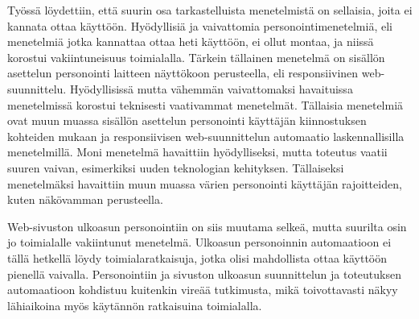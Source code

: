 \documentclass[finnish, 12pt, a4paper, elec, utf8, a-1b, online]{aaltothesis}
\begin{document}
Työssä löydettiin, että suurin osa tarkastelluista menetelmistä on sellaisia,
joita ei kannata ottaa käyttöön. Hyödyllisiä ja vaivattomia
personointimenetelmiä, eli menetelmiä jotka kannattaa ottaa heti käyttöön, ei
ollut montaa, ja niissä korostui vakiintuneisuus toimialalla. Tärkein tällainen
menetelmä on sisällön asettelun personointi laitteen näyttökoon perusteella, eli
responsiivinen web-suunnittelu. Hyödyllisissä mutta vähemmän vaivattomaksi
havaituissa menetelmissä korostui teknisesti vaativammat menetelmät. Tällaisia
menetelmiä ovat muun muassa sisällön asettelun personointi käyttäjän
kiinnostuksen kohteiden mukaan ja responsiivisen web-suunnittelun automaatio
laskennallisilla menetelmillä. Moni menetelmä havaittiin hyödylliseksi, mutta
toteutus vaatii suuren vaivan, esimerkiksi uuden teknologian kehityksen.
Tällaiseksi menetelmäksi havaittiin muun muassa värien personointi käyttäjän
rajoitteiden, kuten näkövamman perusteella.

Web-sivuston ulkoasun personointiin on siis muutama selkeä, mutta suurilta osin
jo toimialalle vakiintunut menetelmä. Ulkoasun personoinnin automaatioon ei
tällä hetkellä löydy toimialaratkaisuja, jotka olisi mahdollista ottaa käyttöön
pienellä vaivalla. Personointiin ja sivuston ulkoasun suunnittelun ja
toteutuksen automaatioon kohdistuu kuitenkin vireää tutkimusta, mikä
toivottavasti näkyy lähiaikoina myös käytännön ratkaisuina toimialalla.

\clearpage

\thesisbibliography{}
\printbibliography{}
\end{document}
